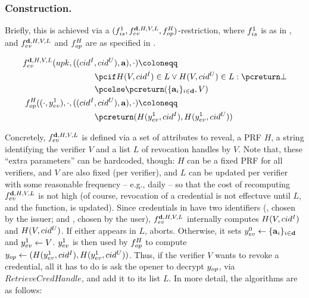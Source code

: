 \subsubsection{\CUASRAC Construction.} %
Briefly, this is achieved via a $(f_{is}^1,f_{ev}^{\mathbf{d},H,V,L},
f_{op}^{H})$-\CUASGenInt restriction, where $f_{is}^1$ is as in
, and $f_{ev}^{\mathbf{d},H,V,L}$ and $f_{op}^{H}$
are as specified in .

\begin{align}
  \feval^{\dattrs,H,V,L}(\upk,((\cidi,\cidu),\attrs),\cdot) \coloneqq &
    \nonumber \\
  & \hspace*{-10em} \pcif H(V,\cidi) \in L \lor H(V,\cidu) \in L: \pcreturn \bot
  \nonumber \\
  & \hspace*{-10em} \pcelse \pcreturn (\lbrace \attrs_i \rbrace_{i\in \dattrs},V) \nonumber \\
  \finsp^{H}((\cdot,\yeval^1),\cdot,((\cidi,\cidu),\attrs),\cdot)
  \coloneqq  & \nonumber \\
  & \hspace*{-10em} \pcreturn (H(\yeval^1,\cidi),H(\yeval^1,\cidu))
  \label{eq:funcs-rac}
\end{align}

Concretely, $f_{ev}^{\mathbf{d},H,V,L}$ is defined via a set of attributes \dattrs
to reveal, a PRF $H$, a string identifying the verifier $V$
and a list $L$ of revocation handles by $V$. Note that, these ``extra
parameters'' can be hardcoded, though: $H$ can be a fixed PRF for all verifiers,
\dattrs and $V$ are also fixed (per verifier), and $L$ can be updated per
verifier with some reasonable frequency -- e.g., daily -- so that the cost of
recomputing $f_{ev}^{\mathbf{d},H,V,L}$ is not high (of course, revocation of a
credential is not effectuve until $L$, and the function, is updated).
%
Since credentials in \CUASGenInt have two identifiers (\cidi, chosen by the
issuer; and \cidu, chosen by the user), $f_{ev}^{\mathbf{d},H,V,L}$ internally
computes $H(V,cid^I)$ and $H(V,cid^U)$. If either appears in $L$, \feval aborts.
Otherwise, it sets $y_{ev}^0 \gets \lbrace \mathbf{a}_i \rbrace_{i\in\mathbf{d}}$ and
$y_{ev}^1 \gets V$. $y_{ev}^1$ is
then used by $f_{op}^H$ to compute $y_{op} \gets (H(y_{ev}^1,cid^I),
H(y_{ev}^1,cid^U))$. Thus, if the verifier $V$ wants to revoke a credential, all
it has to do is ask the opener to decrypt $y_{op}$, via $RetrieveCredHandle$,
and add it to its list $L$.
%
In more detail, the algorithms are as follows:

